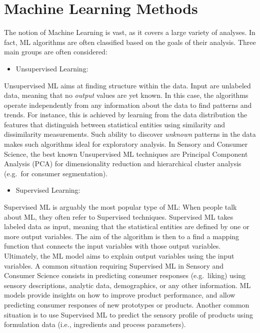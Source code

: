 \documentclass[
]{krantz}
\providecommand{\tightlist}{%
  \setlength{\itemsep}{0pt}\setlength{\parskip}{0pt}}
\begin{document}
\hypertarget{machine-learning-methods}{%
\section{Machine Learning Methods}\label{machine-learning-methods}}

The notion of Machine Learning is vast, as it covers a large variety of analyses. In fact, ML algorithms are often classified based on the goals of their analysis. Three main groups are often considered:

\begin{itemize}
\tightlist
\item
  Unsupervised Learning:
\end{itemize}

Unsupervised ML aims at finding structure within the data. Input are unlabeled data, meaning that no \emph{output} values are yet known. In this case, the algorithms operate independently from any information about the data to find patterns and trends. For instance, this is achieved by learning from the data distribution the features that distinguish between statistical entities using similarity and dissimilarity measurements.
Such ability to discover \emph{unknown} patterns in the data makes such algorithms ideal for exploratory analysis. In Sensory and Consumer Science, the best known Unsupervised ML techniques are Principal Component Analysis (PCA) for dimensionality reduction and hierarchical cluster analysis (e.g.~for consumer segmentation).

\begin{itemize}
\tightlist
\item
  Supervised Learning:
\end{itemize}

Supervised ML is arguably the most popular type of ML: When people talk about ML, they often refer to Supervised techniques. Supervised ML takes labeled data as input, meaning that the statistical entities are defined by one or more output variables. The aim of the algorithm is then to a find a mapping function that connects the input variables with those output variables. Ultimately, the ML model aims to explain output variables using the input variables.
A common situation requiring Supervised ML in Sensory and Consumer Science consists in predicting consumer responses (e.g.~liking) using sensory descriptions, analytic data, demographics, or any other information. ML models provide insights on how to improve product performance, and allow predicting consumer responses of new prototypes or products. Another common situation is to use Supervised ML to predict the sensory profile of products using formulation data (i.e., ingredients and process parameters).
\end{document}
